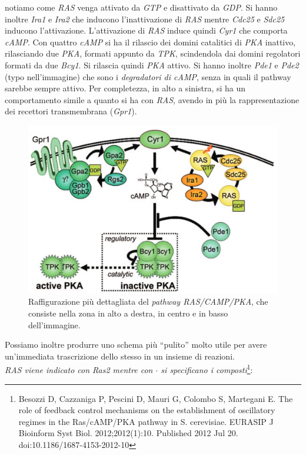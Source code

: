 \documentclass[a4paper,12pt, oneside]{book}
\begin{document}
notiamo come \textit{RAS} venga attivato da \textit{GTP} e disattivato da
\textit{GDP}. Si hanno inoltre \textit{Ira1} e \textit{Ira2} che inducono
l'inattivazione di \textit{RAS} mentre \textit{Cdc25} e \textit{Sdc25} inducono
l'attivazione. L'attivazione di \textit{RAS} induce quindi \textit{Cyr1} che
comporta \textit{cAMP}. Con quattro \textit{cAMP} si ha il rilascio dei domini
catalitici di \textit{PKA} inattivo, rilasciando due \textit{PKA},
formati appunto da \textit{TPK}, scindendola dai domini regolatori formati da
due \textit{Bcy1}. Si rilascia quindi \textit{PKA} attivo. Si hanno inoltre
\textit{Pde1} e \textit{Pde2} (typo nell'immagine) che sono i
\textit{degradatori di cAMP}, senza in quali il pathway sarebbe sempre
attivo. Per completezza, in 
alto a sinistra, si ha un comportamento simile a quanto si ha con \textit{RAS},
avendo in più la rappresentazione dei recettori transmembrana (\textit{Gpr1}).
\begin{figure}
  \centering
  \includegraphics[scale = 0.22]{img/figuregluco.jpg}
  \caption{Raffigurazione più dettagliata del \textit{pathway RAS/CAMP/PKA}, che
    consiste nella zona in alto a destra, in centro e in basso dell'immagine.}
  \label{fig:figuregluco}
\end{figure}
\newpage
\noindent
Possiamo inoltre produrre uno schema più ``pulito'' molto utile per avere
un'immediata trascrizione dello stesso in un insieme di reazioni. \\
\textit{RAS viene indicato con Ras2 mentre con $\cdot$ si specificano i
  composti}\footnote{Besozzi D, Cazzaniga P, Pescini D, Mauri G, Colombo S,
  Martegani E. The role of feedback control mechanisms on the establishment of
  oscillatory regimes in the Ras/cAMP/PKA pathway in S. cerevisiae. EURASIP J
  Bioinform Syst Biol. 2012;2012(1):10. Published 2012 Jul
  20. doi:10.1186/1687-4153-2012-10}: 
\end{document}
